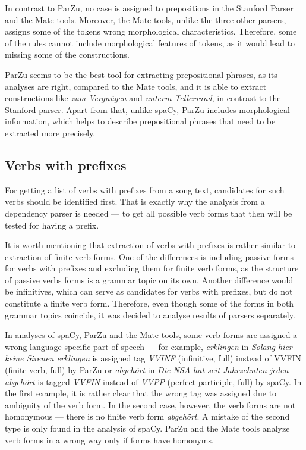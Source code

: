 In contrast to ParZu, no case is assigned to prepositions in the Stanford Parser and the Mate tools. Moreover, the Mate tools, unlike the three other parsers, assigns some of the tokens wrong morphological characteristics. Therefore, some of the rules cannot include morphological features of tokens, as it would lead to missing some of the constructions. 

ParZu seems to be the best tool for extracting prepositional phrases, as its analyses are right, compared to the Mate tools, and it is able to extract constructions like \textit{zum Vergnügen} and \textit{unterm Tellerrand}, in contrast to the Stanford parser. Apart from that, unlike spaCy, ParZu includes morphological information, which helps to describe prepositional phrases that need to be extracted more precisely.

\subsection{Verbs with prefixes}

For getting a list of verbs with prefixes from a song text, candidates for such verbs should be identified first. That is exactly why the analysis from a dependency parser is needed --- to get all possible verb forms that then will be tested for having a prefix. 

It is worth mentioning that extraction of verbs with prefixes is rather similar to extraction of finite verb forms. One of the differences is including passive forms for verbs with prefixes and excluding them for finite verb forms, as the structure of passive verbs forms is a grammar topic on its own. Another difference would be infinitives, which can serve as candidates for verbs with prefixes, but do not constitute a finite verb form. Therefore, even though some of the forms in both grammar topics coincide, it was decided to analyse results of parsers separately.

In analyses of spaCy, ParZu and the Mate tools, some verb forms are assigned a wrong language-specific part-of-speech --- for example, \textit{erklingen} in \textit{Solang hier keine Sirenen erklingen} is assigned tag \textit{VVINF} (infinitive, full) instead of VVFIN (finite verb, full) by ParZu or \textit{abgehört} in \textit{Die NSA hat seit Jahrzehnten jeden abgehört} is tagged \textit{VVFIN} instead of \textit{VVPP} (perfect participle, full) by spaCy. In the first example, it is rather clear that the wrong tag was assigned due to ambiguity of the verb form. In the second case, however, the verb forms are not homonymous --- there is no finite verb form \textit{abgehört}. A mistake of the second type is only found in the analysis of spaCy. ParZu and the Mate tools analyze verb forms in a wrong way only if forms have homonyms.


